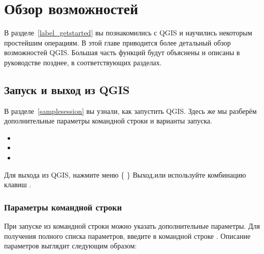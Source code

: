 
\chapter{Обзор возможностей}\label{feature_glance}


В разделе~\ref{label_getstarted} вы познакомились с QGIS и научились
некоторым простейшим операциям. В этой главе приводится более детальный обзор
возможностей QGIS. Большая часть функций будут объяснены и
описаны в руководстве позднее, в соответствующих разделах.

\section{Запуск и выход из QGIS}\label{label_startinqgis}

В разделе~\ref{samplesession} вы узнали, как запустить QGIS. Здесь же мы разберём
дополнительные параметры командной строки и варианты запуска.

\begin{itemize}
\item {}
\item {}
\item {}
\end{itemize}

Для выхода из QGIS, нажмите меню \{\nix{} \} \arrow
Выход,или используйте комбинацию клавиш .

\subsection{Параметры командной строки}
\label{label_commandline}

\nix При запуске \qg из командной строки можно указать дополнительные параметры.
Для получения полного списка параметров, введите в командной строке
. Описание параметров выглядит следующим образом:

